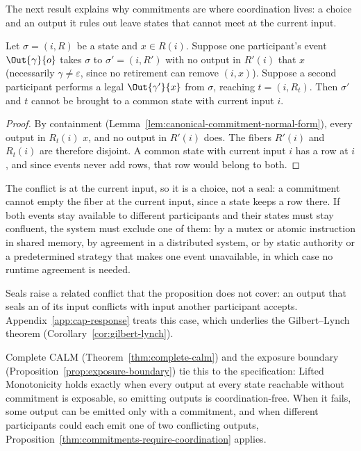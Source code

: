 The next result explains why commitments are where coordination lives: a
choice and an output it rules out leave states that cannot meet at the
current input.

\begin{proposition}
\label{thm:commitments-require-coordination}
Let $\sigma=(i,R)$ be a state and $x\in R(i)$.  Suppose one participant's
event $\Out{\gamma}{o}$ takes $\sigma$ to $\sigma'=(i,R')$ with no output in
$R'(i)$ that \outrel $x$ (necessarily $\gamma\neq\varepsilon$, since no
retirement can remove $(i,x)$).  Suppose a second participant performs a legal
$\Out{\gamma'}{x}$ from $\sigma$, reaching $t=(i,R_t)$.  Then $\sigma'$ and $t$ cannot be brought to a
common state with current input $i$.
\end{proposition}

\begin{proof}
By containment (Lemma~\ref{lem:canonical-commitment-normal-form}), every
output in $R_t(i)$ \outrel $x$, and no output in $R'(i)$ does.  The fibers
$R'(i)$ and $R_t(i)$ are therefore disjoint.  A common state with current
input $i$ has a row at $i$, and since events never add rows, that row would
belong to both.
\end{proof}

The conflict is at the current input, so it is a choice, not a seal: a
commitment cannot empty the fiber at the current input, since a state keeps a
row there.  If both events stay available to different participants and their
states must stay confluent, the system must exclude one of them: by a mutex or
atomic instruction in shared memory, by agreement in a distributed system, or by
static authority or a predetermined strategy that makes one event unavailable,
in which case no runtime agreement is needed.

Seals raise a related conflict that the proposition does not cover: an output
that seals an \indesc of its input conflicts with input another participant
accepts.  Appendix~\ref{app:cap-response} treats this case, which underlies the
Gilbert--Lynch theorem (Corollary~\ref{cor:gilbert-lynch}).

Complete CALM (Theorem~\ref{thm:complete-calm}) and the exposure boundary
(Proposition~\ref{prop:exposure-boundary}) tie this to the specification: Lifted
Monotonicity holds exactly when every output at every state reachable without
commitment is exposable, so emitting outputs is coordination-free.  When it
fails, some output can be emitted only with a commitment, and when different
participants could each emit one of two conflicting outputs,
Proposition~\ref{thm:commitments-require-coordination} applies.

